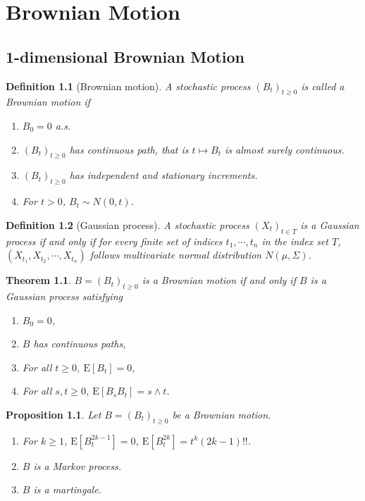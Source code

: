 \documentclass{report}
\newtheorem{definition}{Definition}[section]
\newtheorem{proposition}{Proposition}[section]
\newtheorem{theorem}{Theorem}[section]
\theoremstyle{nonumberplain}
\begin{document}
\chapter{Brownian Motion}
\section{1-dimensional Brownian Motion}
\begin{definition}[Brownian motion]
	A stochastic process $(B_t)_{t\ge0}$ is called a \emph{Brownian motion} if
	\begin{enumerate}
		\item $B_0=0$ a.s.
		\item $(B_t)_{t\ge0}$ has continuous path, that is $t\mapsto B_t$ is almost surely continuous.
		\item $(B_t)_{t\ge0}$ has independent and stationary increments.
		\item For $t>0$, $B_t\sim N(0,t)$.
	\end{enumerate}
\end{definition}

\begin{definition}[Gaussian process]
	A stochastic process $(X_t)_{t\in T}$ is a \emph{Gaussian process} if and only if for every finite set of indices $t_{1},\cdots ,t_{n}$ in the index set $T$, $(X_{t_1},X_{t_2},\cdots,X_{t_n})$ follows multivariate normal distribution $N(\mu,\Sigma)$.
\end{definition}

\begin{theorem}
	$B=(B_t)_{t\ge0}$ is a Brownian motion if and only if $B$ is a Gaussian process satisfying
	\begin{enumerate}
		\item $B_0=0$,
		\item $B$ has continuous paths,
		\item For all $t\ge0$, $\mathrm{E}[B_t]=0$,
		\item For all $s,t\ge0$, $\mathrm{E}[B_sB_t]=s\wedge t$.
	\end{enumerate}
\end{theorem}
\begin{proposition}
	Let $B=(B_t)_{t\ge0}$ be a Brownian motion.
	\begin{enumerate}
		\item For $k\ge1$, $\mathrm{E}[B_t^{2k-1}]=0$, $\mathrm{E}[B_t^{2k}]=t^{k}(2k-1)!!$.
		\item $B$ is a Markov process. 
		\item $B$ is a martingale.
	\end{enumerate}
\end{proposition}
\end{document}
